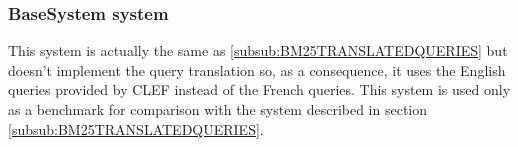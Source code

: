 \subsubsection{BaseSystem system}
\label{subsub:BaseSystem}
This system is actually the same as \ref{subsub:BM25TRANSLATEDQUERIES} but doesn't implement the query translation so, as a consequence, it uses the English queries provided by CLEF instead of the French queries. This system is used only as a benchmark for comparison with the system described in section \ref{subsub:BM25TRANSLATEDQUERIES}.